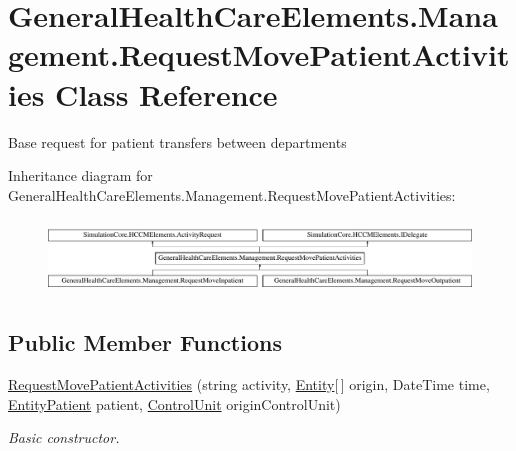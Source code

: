 \hypertarget{class_general_health_care_elements_1_1_management_1_1_request_move_patient_activities}{}\section{General\+Health\+Care\+Elements.\+Management.\+Request\+Move\+Patient\+Activities Class Reference}
\label{class_general_health_care_elements_1_1_management_1_1_request_move_patient_activities}


Base request for patient transfers between departments  


Inheritance diagram for General\+Health\+Care\+Elements.\+Management.\+Request\+Move\+Patient\+Activities\+:\begin{figure}[H]
\begin{center}
\leavevmode
\includegraphics[height=1.981132cm]{class_general_health_care_elements_1_1_management_1_1_request_move_patient_activities}
\end{center}
\end{figure}
\subsection*{Public Member Functions}
\begin{DoxyCompactItemize}
\item 
\hyperlink{class_general_health_care_elements_1_1_management_1_1_request_move_patient_activities_a4f69df2ff98afbe04dfef7109c6f36fd}{Request\+Move\+Patient\+Activities} (string activity, \hyperlink{class_simulation_core_1_1_h_c_c_m_elements_1_1_entity}{Entity}\mbox{[}$\,$\mbox{]} origin, Date\+Time time, \hyperlink{class_general_health_care_elements_1_1_entities_1_1_entity_patient}{Entity\+Patient} patient, \hyperlink{class_simulation_core_1_1_h_c_c_m_elements_1_1_control_unit}{Control\+Unit} origin\+Control\+Unit)
\begin{DoxyCompactList}\small\item\em Basic constructor. \end{DoxyCompactList}\end{DoxyCompactItemize}
